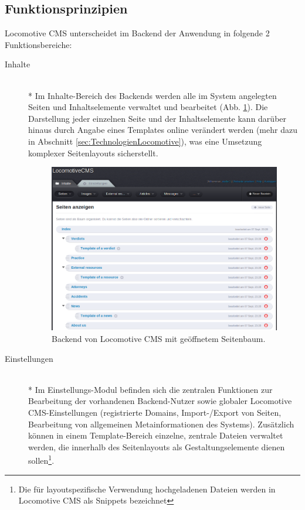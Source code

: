 \subsection{Funktionsprinzipien}
Locomotive CMS unterscheidet im Backend der Anwendung in folgende 2 Funktionsbereiche:
\begin{description}
\item[Inhalte]\mbox{~}\\*
Im Inhalte-Bereich des Backends werden alle im System angelegten Seiten und Inhaltselemente verwaltet und bearbeitet (Abb. \ref{locomotivebackend}). Die Darstellung jeder einzelnen Seite und der Inhaltselemente kann darüber hinaus durch Angabe eines Templates online verändert werden (mehr dazu in Abschnitt \ref{sec:TechnologienLocomotive}), was eine Umsetzung komplexer Seitenlayouts sicherstellt.
\begin{figure}[!h]
\begin{center}
\includegraphics[scale=0.45]{images/analyse/locomotive/backendlocomotive.png}
\caption{Backend von Locomotive CMS mit geöffnetem Seitenbaum.}
\label{locomotivebackend}
\end{center}
\end{figure}
\item[Einstellungen]\mbox{~}\\*
Im Einstellungs-Modul befinden sich die zentralen Funktionen zur Bearbeitung der vorhandenen Backend-Nutzer sowie globaler Locomotive CMS-Einstellungen (registrierte Domains, Import-/Export von Seiten, Bearbeitung von allgemeinen Metainformationen des Systems). Zusätzlich können in einem Template-Bereich einzelne, zentrale Dateien verwaltet werden, die innerhalb des Seitenlayouts als Gestaltungselemente dienen sollen\footnote{Die für layoutspezifische Verwendung hochgeladenen Dateien werden in Locomotive CMS als Snippets bezeichnet}.
\end{description}
